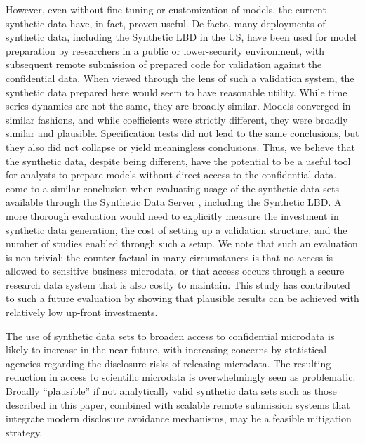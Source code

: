 \documentclass[10pt]{article}
\begin{document}
However, even without  fine-tuning or customization of models, the current synthetic data have, in fact, proven useful. De facto, many deployments of synthetic data, including the Synthetic LBD in the US, have been used for model preparation by researchers in a public or lower-security environment, with subsequent remote submission of prepared code for validation against the confidential data. When viewed through the lens of such a validation system, the synthetic data prepared here would seem to have reasonable utility. While time series dynamics are not the same, they are broadly similar. Models converged in similar fashions, and while coefficients were strictly different, they were broadly similar and plausible. Specification tests did not lead to the same conclusions, but they also did not collapse or yield meaningless conclusions. Thus, we believe that the synthetic data, despite being different, have the potential to be a useful tool for analysts to prepare models without direct access to the confidential data. \textcite{VilhuberAbowd2016-SOLE,Vilhuber2019-SGP} come to a similar conclusion when evaluating usage of the synthetic data sets available through the Synthetic Data Server \citep{AbowdVilhuber2010}, including the Synthetic LBD. A more thorough evaluation would need to explicitly measure the investment in synthetic data generation, the cost of setting up a validation structure, and the number of studies enabled through such a setup. We note that such an evaluation is non-trivial: the counter-factual in many circumstances is that no access is allowed to sensitive business microdata, or that access occurs through a secure research data system that is also costly to maintain. This study has contributed to such a future evaluation by showing that plausible results can be achieved with relatively low up-front investments.
 
The use of synthetic data sets to broaden access to confidential microdata is likely to increase in the near future, with increasing concerns by statistical agencies regarding the disclosure risks of releasing microdata. The resulting reduction in access to scientific microdata is overwhelmingly seen as problematic. Broadly ``plausible'' if not analytically valid synthetic data sets such as those described in this paper, combined with scalable remote submission systems that integrate modern disclosure avoidance mechanisms, may be a feasible mitigation strategy. 
 
\end{document}
